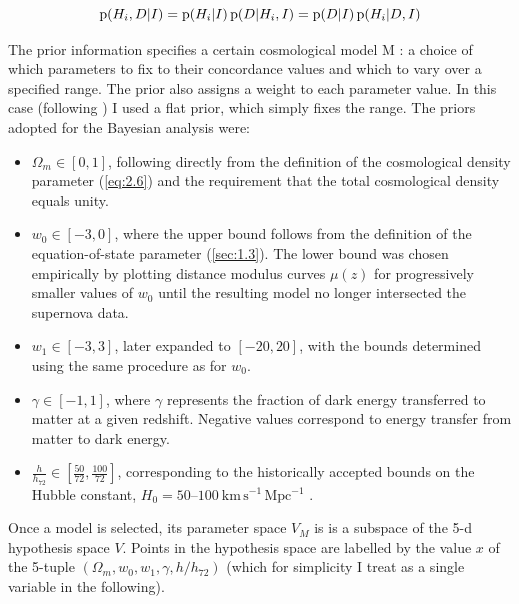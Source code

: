 \begin{equation}
    \prob{H_{i},D}[I]
    = \prob{H_{i}}[I] \prob{D}[H_{i},I]
    = \prob{D}[I] \prob{H_{i}}[D,I]
\label{eq:2.1}
\end{equation}

The prior information specifies a certain cosmological model M : a choice of which parameters to fix to their concordance values and which to vary over a specified range. The prior also assigns a weight to each parameter value. In this case (following \cite{LewisBridle2002}) I used a flat prior, which simply fixes the range. 
The priors adopted for the Bayesian analysis were:
\begin{itemize}
\item $\Omega_m \in [0,1]$, following directly from the definition of the cosmological density parameter (\cref{eq:2.6}) and the requirement that the total cosmological density equals unity.

\item $w_0 \in [-3,0]$, where the upper bound follows from the definition of the equation-of-state parameter (\cref{sec:1.3}). The lower bound was chosen empirically by plotting distance modulus curves $\mu(z)$ for progressively smaller values of $w_0$ until the resulting model no longer intersected the supernova data.

\item $w_1 \in [-3,3]$, later expanded to $[-20,20]$, with the bounds determined using the same procedure as for $w_0$.

\item $\gamma \in [-1,1]$, where $\gamma$ represents the fraction of dark energy transferred to matter at a given redshift. Negative values correspond to energy transfer from matter to dark energy.

\item $\displaystyle \frac{h}{h_{72}} \in \left[\frac{50}{72},\frac{100}{72}\right]$, corresponding to the historically accepted bounds on the Hubble constant, $H_0 = 50$--$100\ \mathrm{km\,s^{-1}\,Mpc^{-1}}$ \cite{Silk1989}.
\end{itemize}

Once a model is selected, its parameter space $V_M$ is is a subspace of the 5-d hypothesis space $V$. Points in the hypothesis space are labelled by the value $x$ of the 5-tuple $(\Omega_m, w_0 , w_1, \gamma, h/h_{72})$ (which for simplicity I treat as a single variable in the following). 

